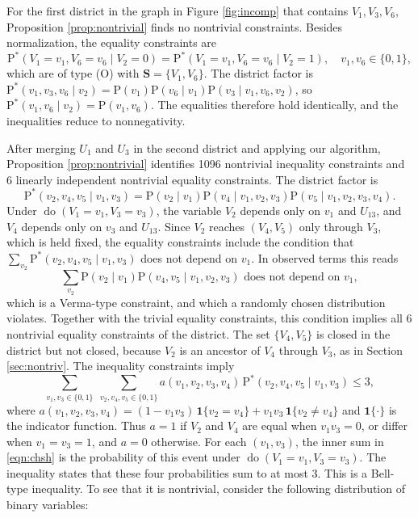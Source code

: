 \documentclass[12pt]{article}
\def\Pr{{\mathrm{P}}}
\def\Pdo{{\mathrm{P}^*}}
\newcommand{\bS}{\boldsymbol{S}}
\DeclareMathOperator{\Do}{do}
\begin{document}
For the first district in the graph in Figure \ref{fig:incomp} that contains $V_1, V_3, V_6$, Proposition \ref{prop:nontrivial} finds no nontrivial constraints. Besides normalization, the equality constraints are
\[
\Pdo(V_1 = v_1, V_6 = v_6 \mid V_2 = 0) = \Pdo(V_1 = v_1, V_6 = v_6 \mid V_2 = 1), \quad v_1, v_6 \in \{0, 1\},
\]
which are of type (O) with $\bS = \{V_1, V_6\}$. The district factor is $\Pdo(v_1, v_3, v_6 \mid v_2) = \Pr(v_1)\Pr(v_6 \mid v_1)\Pr(v_3 \mid v_1, v_6, v_2)$, so $\Pdo(v_1, v_6 \mid v_2) = \Pr(v_1, v_6)$. The equalities therefore hold identically, and the inequalities reduce to nonnegativity.


After merging $U_1$ and $U_3$ in the second district and applying our algorithm, Proposition \ref{prop:nontrivial} identifies 1096 nontrivial inequality constraints and 6 linearly independent nontrivial equality constraints. The district factor is
\[
\Pdo(v_2, v_4, v_5 \mid v_1, v_3) = \Pr(v_2 \mid v_1)\Pr(v_4 \mid v_1, v_2, v_3)\Pr(v_5 \mid v_1, v_2, v_3, v_4).
\]
Under $\Do(V_1 = v_1, V_3 = v_3)$, the variable $V_2$ depends only on $v_1$ and $U_{13}$, and $V_4$ depends only on $v_3$ and $U_{13}$. Since $V_2$ reaches $(V_4, V_5)$ only through $V_3$, which is held fixed, the equality constraints include the condition that $\sum_{v_2}\Pdo(v_2, v_4, v_5 \mid v_1, v_3)$ does not depend on $v_1$. In observed terms this reads
\[
\sum_{v_2} \Pr(v_2 \mid v_1)\Pr(v_4, v_5 \mid v_1, v_2, v_3) \mbox{ does not depend on } v_1,
\]
which is a Verma-type constraint, and which a randomly chosen distribution violates. Together with the trivial equality constraints, this condition implies all 6 nontrivial equality constraints of the district. The set $\{V_4, V_5\}$ is closed in the district but not closed, because $V_2$ is an ancestor of $V_4$ through $V_3$, as in Section \ref{sec:nontriv}. The inequality constraints imply
\begin{equation}
\sum_{v_1, v_3 \in \{0,1\}} \; \sum_{v_2, v_4, v_5 \in \{0,1\}} a(v_1, v_2, v_3, v_4) \, \Pdo(v_2, v_4, v_5 \mid v_1, v_3) \leq 3, \label{eqn:chsh}
\end{equation}
where $a(v_1, v_2, v_3, v_4) = (1 - v_1 v_3)\,\mathbf{1}\{v_2 = v_4\} + v_1 v_3\,\mathbf{1}\{v_2 \neq v_4\}$ and $\mathbf{1}\{\cdot\}$ is the indicator function. Thus $a = 1$ if $V_2$ and $V_4$ are equal when $v_1 v_3 = 0$, or differ when $v_1 = v_3 = 1$, and $a = 0$ otherwise. For each $(v_1, v_3)$, the inner sum in \eqref{eqn:chsh} is the probability of this event under $\Do(V_1 = v_1, V_3 = v_3)$. The inequality states that these four probabilities sum to at most 3. This is a Bell-type inequality. To see that it is nontrivial, consider the following distribution of binary variables:
\end{document}
